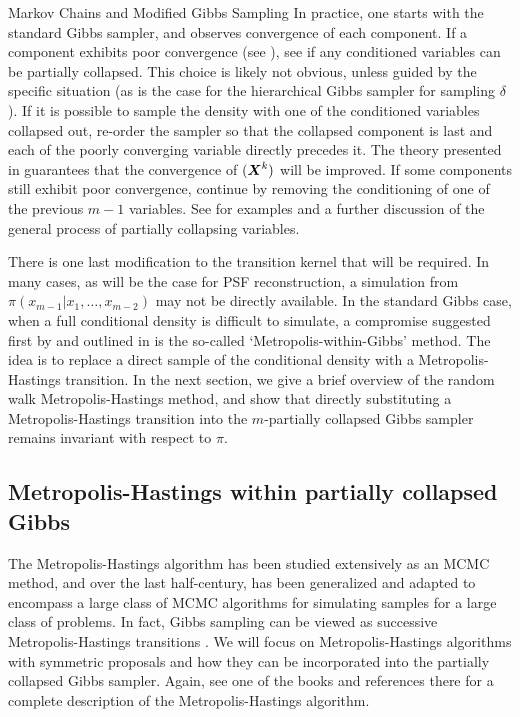 \begin{chapter}{Markov Chains and Modified Gibbs Sampling}
In practice, one starts with the standard Gibbs sampler, and observes convergence of each component.
If a component exhibits poor convergence (see ), see if any conditioned variables can be partially collapsed.
This choice is likely not obvious, unless guided by the specific situation (as is the case for the hierarchical Gibbs sampler for sampling $\delta$).
If it is possible to sample the density with one of the conditioned variables collapsed out, re-order the sampler so that the collapsed component is last and each of the poorly converging variable directly precedes it. 
The theory presented in \citep{van2008partially} guarantees that the convergence of $(\mbox{\boldmath$X$}^k)$ will be improved.
If some components still exhibit poor convergence, continue by removing the conditioning of one of the previous $m-1$ variables.
See \citep{van2008partially} for examples and a further discussion of the general process of partially collapsing variables.

There is one last modification to the transition kernel that will be required.
In many cases, as will be the case for PSF reconstruction, a simulation from $\pi(x_{m-1}|x_1,\dots, x_{m-2})$ may not be directly available.
In the standard Gibbs case, when a full conditional density is difficult to simulate, a compromise suggested first by \citep{muller1992alternatives} and outlined in \citep{robert2013monte} is the so-called `Metropolis-within-Gibbs' method.
The idea is to replace a direct sample of the conditional density with a Metropolis-Hastings transition. 
In the next section, we give a brief overview of the random walk Metropolis-Hastings method, and show that directly substituting a Metropolis-Hastings transition into the $m$-partially collapsed Gibbs sampler remains invariant with respect to $\pi$.

\subsection{Metropolis-Hastings within partially collapsed Gibbs}
The Metropolis-Hastings algorithm \citep{metropolis1953equation} has been studied extensively as an MCMC method, and over the last half-century, has been generalized and adapted to encompass a large class of MCMC algorithms for simulating samples for a large class of problems. 
In fact, Gibbs sampling can be viewed as successive Metropolis-Hastings transitions \citep{robert2013monte}.
We will focus on Metropolis-Hastings algorithms with symmetric proposals and how they can be incorporated into the partially collapsed Gibbs sampler.
Again, see one of the books \citep{calvetti2007introduction,liu2008monte,robert2013monte} and references there for a complete description of the Metropolis-Hastings algorithm.


\end{chapter}
